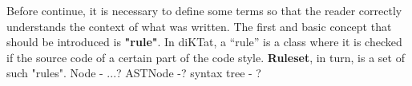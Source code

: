 Before continue, it is necessary to define some terms so that the reader correctly understands the context of what was written. The first and basic concept that should be introduced is \textbf{"rule"}. In diKTat, a “rule” is a class where it is checked if the source code of a certain part of the code style. \textbf{Ruleset}, in turn, is a set of such "rules". Node - ...? ASTNode -? syntax tree - ? 